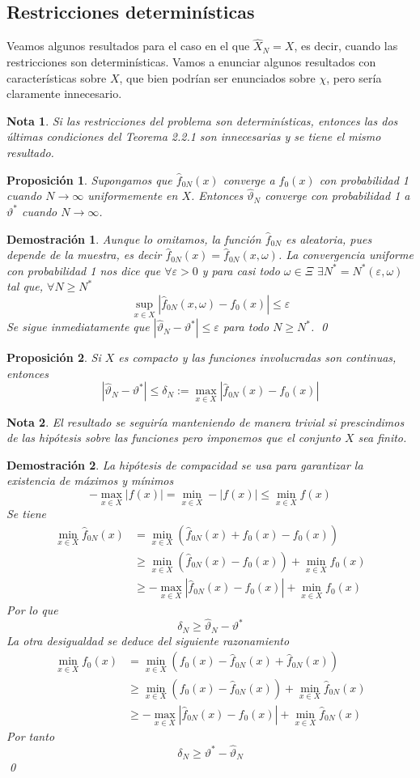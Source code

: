 \documentclass[twoside,a4paper,openright,12pt]{book}
\newtheorem{prop}{Proposici\'on}[section]
\newtheorem{nota}{Nota}[section]
\newtheorem*{dem}{Demostración}
\providecommand{\abs}[1]{\left|{#1}\right|}
\newcommand{\fn}{\hat{f}_{0N}}
\newcommand{\va}{\hat{\vartheta}_N}
\begin{document}
\subsection{Restricciones determinísticas}
Veamos algunos resultados para el caso en el que $\hat{X}_N=X$, es decir, cuando las restricciones son determinísticas. Vamos a enunciar algunos resultados con características sobre $X$, que bien podrían ser enunciados sobre $\chi$, pero sería claramente innecesario.
\begin{nota}
Si las restricciones del problema son determinísticas, entonces las dos últimas condiciones del Teorema 2.2.1 son innecesarias y se tiene el mismo resultado.
\end{nota}
\begin{prop} Supongamos que $\hat{f}_{0N}(x)$ converge a $f_0(x)$ con probabilidad 1 cuando $N\to \infty$ uniformemente en $X$. Entonces $\va$ converge con probabilidad 1 a $\vartheta^*$ cuando $N\to \infty$.
\end{prop}
\begin{dem}
Aunque lo omitamos, la función $\hat{f}_{0N}$ es aleatoria, pues depende de la muestra, es decir $\hat{f}_{0N}(x)=\hat{f}_{0N}(x,\omega)$. La convergencia uniforme con probabilidad 1 nos dice que $\forall \varepsilon >0$ y para casi todo $\omega \in \Xi$ $\exists N^*=N^*(\varepsilon,\omega)$ tal que, $\forall N\geq N^*$
$$
\sup_{x\in X}\abs{\hat{f}_{0N}(x,\omega)-f_0(x)}\leq \varepsilon
$$
Se sigue inmediatamente que $\abs{\va-\vartheta^*}\leq\varepsilon$ para todo $N\geq N^*$. \qed
\end{dem}
\begin{prop}\label{desi} Si $X$ es compacto y las funciones involucradas son continuas, entonces
$$
\abs{\va-\vartheta^*}\leq \delta_N:= \max_{x\in X}\abs{\hat{f}_{0N}(x)-f_0(x)}
$$
\end{prop}
\begin{nota}
El resultado se seguiría manteniendo de manera trivial si prescindimos de las hipótesis sobre las funciones pero imponemos que el conjunto $X$ sea finito.
\end{nota}
\begin{dem}
La hipótesis de compacidad se usa para garantizar la existencia de máximos y mínimos
$$
-\max_{x\in X}|f(x)| = \min_{x\in X}-|f(x)| \leq \min_{x\in X}f(x)
$$
Se tiene
\begin{align*}
\min_{x\in X}\hat{f}_{0N}(x) &= \min_{x\in X}(\hat{f}_{0N}(x)+f_0(x)-f_0(x)) \\
&\geq \min_{x\in X}(\hat{f}_{0N}(x)-f_0(x))+\min_{x\in X}f_0(x)\\
&\geq -\max_{x\in X}\abs{\hat{f}_{0N}(x)-f_0(x)}+\min_{x\in X}f_0(x)
\end{align*}
Por lo que
$$
\delta_N \geq \va-\vartheta^*
$$
La otra desigualdad se deduce del siguiente razonamiento
\begin{align*}
\min_{x\in X}{f}_{0}(x) &= \min_{x\in X}(f_0(x)-\fn(x)+\fn(x)) \\
&\geq \min_{x\in X}(f_0(x)-\hat{f}_{0N}(x))+\min_{x\in X}\fn(x)\\
&\geq -\max_{x\in X}\abs{\hat{f}_{0N}(x)-f_0(x)}+\min_{x\in X}\fn(x)
\end{align*}
Por tanto
$$
\delta_N\geq \vartheta^*-\va
$$ \qed
\end{dem}
\end{document}
